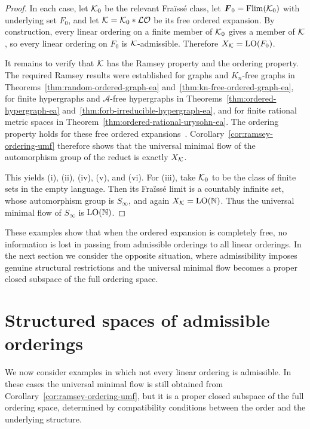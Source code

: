 \begin{proof}
In each case, let \(\mathcal{K}_0\) be the relevant Fraïssé class, let
\(\boldsymbol{F}_0=\operatorname{Flim}(\mathcal{K}_0)\) with underlying set \(F_0\), and let
\(\mathcal{K}=\mathcal{K}_0 * \mathcal{LO}\) be its free ordered expansion. By construction, every
linear ordering on a finite member of \(\mathcal{K}_0\) gives a member of \(\mathcal{K}\), so every
linear ordering on \(F_0\) is \(\mathcal{K}\)-admissible. Therefore
\(X_{\mathcal{K}}=\operatorname{LO}(F_0)\).

It remains to verify that \(\mathcal{K}\) has the Ramsey property and the ordering property. The required Ramsey results were established for graphs and \(K_n\)-free graphs in Theorems~\ref{thm:random-ordered-graph-ea} and~\ref{thm:kn-free-ordered-graph-ea}, for finite hypergraphs and \(\mathcal A\)-free hypergraphs in Theorems~\ref{thm:ordered-hypergraph-ea} and~\ref{thm:forb-irreducible-hypergraph-ea}, and for finite rational metric spaces in Theorem~\ref{thm:ordered-rational-urysohn-ea}. The ordering property holds for these free ordered expansions~\cite{KPT05}. Corollary~\ref{cor:ramsey-ordering-umf} therefore shows that the universal minimal flow of the automorphism group of the reduct is exactly \(X_{\mathcal{K}}\).

This yields (i), (ii), (iv), (v), and (vi). For (iii), take \(\mathcal{K}_0\) to be the class of finite sets in the empty language. Then its Fraïssé limit is a countably infinite set, whose automorphism group is \(S_\infty\), and again \(X_{\mathcal{K}}=\operatorname{LO}(\mathbb{N})\).
Thus the universal minimal flow of \(S_\infty\) is \(\operatorname{LO}(\mathbb{N})\).
\end{proof}

These examples show that when the ordered expansion is completely free, no information is lost in passing from admissible orderings to all linear orderings. In the next section we consider the opposite situation, where admissibility imposes genuine structural restrictions and the universal minimal flow becomes a proper closed subspace of the full ordering space.

\section{Structured spaces of admissible orderings}

We now consider examples in which not every linear ordering is admissible. In these cases the universal minimal flow is still obtained from Corollary~\ref{cor:ramsey-ordering-umf}, but it is a proper closed subspace of the full ordering space, determined by compatibility conditions between the order and the underlying structure.

